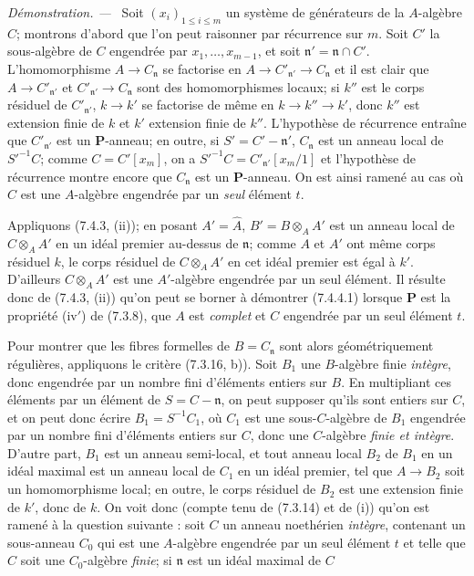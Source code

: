 \documentclass[10pt,oneside]{book}
\newenvironment{proof}{%
  \par\medskip\noindent\textit{Démonstration. ---\ }}{\par}
\begin{document}
\begin{proof}
Soit $(x_i)_{1\leqslant i\leqslant m}$ un système de générateurs de la
$A$-algèbre $C$; montrons d'abord que l'on peut raisonner par récurrence sur
$m$. Soit $C'$ la sous-algèbre de $C$ engendrée par
$x_1,\ldots,x_{m-1}$, et soit $\mathfrak n'=\mathfrak n\cap C'$.
L'homomorphisme $A\to C_{\mathfrak n}$ se factorise en
$A\to C'_{\mathfrak n'}\to C_{\mathfrak n}$ et il est clair que
$A\to C'_{\mathfrak n'}$ et $C'_{\mathfrak n'}\to C_{\mathfrak n}$ sont
des homomorphismes locaux; si $k''$ est le corps résiduel de
$C'_{\mathfrak n'}$, $k\to k'$ se factorise de même en
$k\to k''\to k'$, donc $k''$ est extension finie de $k$ et $k'$ extension
finie de $k''$. L'hypothèse de récurrence entraîne que
$C'_{\mathfrak n'}$ est un $\boldsymbol P$-anneau; en outre, si
$S'=C'-\mathfrak n'$, $C_{\mathfrak n}$ est un anneau local de
$S'^{-1}C$; comme $C=C'[x_m]$, on a
$S'^{-1}C=C'_{\mathfrak n'}[x_m/1]$ et l'hypothèse de récurrence montre
encore que $C_{\mathfrak n}$ est un $\boldsymbol P$-anneau. On est ainsi
ramené au cas où $C$ est une $A$-algèbre engendrée par un \emph{seul}
élément $t$.

Appliquons (7.4.3, (ii)); en posant $A'=\widehat A$,
$B'=B\otimes_A A'$ est un anneau local de $C\otimes_A A'$ en un idéal
premier au-dessus de $\mathfrak n$; comme $A$ et $A'$ ont même corps
résiduel $k$, le corps résiduel de $C\otimes_A A'$ en cet idéal premier est
égal à $k'$. D'ailleurs $C\otimes_A A'$ est une $A'$-algèbre engendrée par
un seul élément. Il résulte donc de (7.4.3, (ii)) qu'on peut se borner à
démontrer (7.4.4.1) lorsque $\boldsymbol P$ est la propriété (iv$'$) de
(7.3.8), que $A$ est \emph{complet} et $C$ engendrée par un seul élément
$t$.

Pour montrer que les fibres formelles de $B=C_{\mathfrak n}$ sont alors
géométriquement régulières, appliquons le critère (7.3.16, b)). Soit $B_1$
une $B$-algèbre finie \emph{intègre}, donc engendrée par un nombre fini
d'éléments entiers sur $B$. En multipliant ces éléments par un élément de
$S=C-\mathfrak n$, on peut supposer qu'ils sont entiers sur $C$, et on peut
donc écrire $B_1=S^{-1}C_1$, où $C_1$ est une sous-$C$-algèbre de $B_1$
engendrée par un nombre fini d'éléments entiers sur $C$, donc une
$C$-algèbre \emph{finie et intègre}. D'autre part, $B_1$ est un anneau
semi-local, et tout anneau local $B_2$ de $B_1$ en un idéal maximal est un
anneau local de $C_1$ en un idéal premier, tel que $A\to B_2$ soit un
homomorphisme local; en outre, le corps résiduel de $B_2$ est une extension
finie de $k'$, donc de $k$. On voit donc (compte tenu de (7.3.14) et de (i))
qu'on est ramené à la question suivante : soit $C$ un anneau noethérien
\emph{intègre}, contenant un sous-anneau $C_0$ qui est une $A$-algèbre
engendrée par un seul élément $t$ et telle que $C$ soit une $C_0$-algèbre
\emph{finie}; si $\mathfrak n$ est un idéal maximal de $C$


\end{proof}
\end{document}
